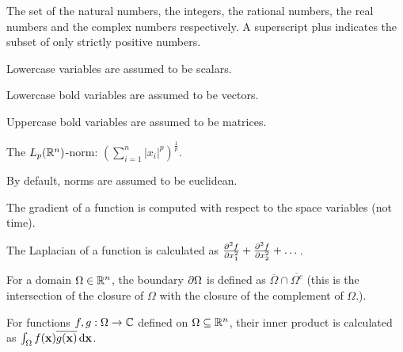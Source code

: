 \begin{description}[leftmargin=4cm, labelsep=0cm, style=multiline, itemsep=2mm, topsep=6mm]
    \item [$\begin{array}{@{}l} \NN, \ZZ, \QQ, \RR, \CC\\\NN^+, \QQ^+, \RR^+\end{array}$] The set of the natural numbers, the integers, the rational numbers, the real numbers and the complex numbers respectively. A superscript plus indicates the subset of only strictly positive numbers.
    \item [$\begin{array}{@{}l} a, b, c, \dots \\ \alpha, \beta, \gamma, \dots \end{array}$] Lowercase variables are assumed to be scalars.
    \item [$\vb{u}, \vb{v}, \dots$] Lowercase bold variables are assumed to be vectors.
    \item [$\vb{B}, \vb{M}, \vb{\Lambda}, \dots$] Uppercase bold variables are assumed to be matrices.
    \item [$\displaystyle\|\vb{x}\|_p $] The $L_p(\mathbb{R}^n)$-norm: $\left(\sum_{i=1}^{n} \left|x_i\right|^p\right)^\frac{1}{p}$.
    \item [$\displaystyle\|\vb{x}\| = \|\vb{x}\|_2$] By default, norms are assumed to be euclidean.
    \item [$\nabla f = \left(\frac{\partial f}{\partial x_1}, \frac{\partial f}{\partial x_2}, \dots\right)^\transposesign$] The gradient of a function is computed with respect to the space variables (not time).
    \item [$\Delta f = \nabla^2 f = \nabla \cdot \nabla f$] The Laplacian of a function is calculated as ${\pdv[2]{f}{x_1}} + {\pdv[2]{f}{x_2}} + \dots$.
    \item [$\dOmega$] For a domain $\Omega \in \mathbb{R}^n$, the boundary $\dOmega$ is defined as $\overline{\Omega} \cap \overline{\Omega^c}$ (this is the intersection of the closure of $\Omega$ with the closure of the complement of $\Omega$.).
    \item [$\displaystyle\bra{f\,}\ket{\,g}$] For functions $f, g : \Omega \to \mathbb{C}$ defined on $\Omega \subseteq \mathbb{R}^n$, their inner product is calculated as $\int_\Omega f(\vb{x}) \overline{g(\vb{x})} \,\dd \vb{x}$.
\end{description}


\stopchapter
